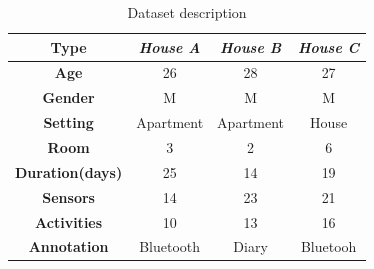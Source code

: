

%

 
\begin{table}[t!]
\small
\begin{center}
\begin{tabular}{|c|c|c|c|}
\hline
\textbf{Type} & \emph{House A} & \emph{House B} & \emph{House C}\\ \hline
\textbf{Age} & 26 & 28 & 27\\ \hline
\textbf{Gender} & M & M & M\\ \hline
\textbf{Setting} & Apartment & Apartment & House\\ \hline
\textbf{Room} & 3 & 2 & 6\\ \hline
\textbf{Duration(days)} & 25 & 14 & 19\\ \hline
\textbf{Sensors} & 14 & 23 & 21\\ \hline
\textbf{Activities} & 10 & 13 & 16\\ \hline
\textbf{Annotation} & Bluetooth & Diary & Bluetooh\\ \hline
\end{tabular}
\end{center}
\caption{Dataset description}
\label{table:datasets}
\vspace{-0.3cm}
\end{table}




%
%
%
%


